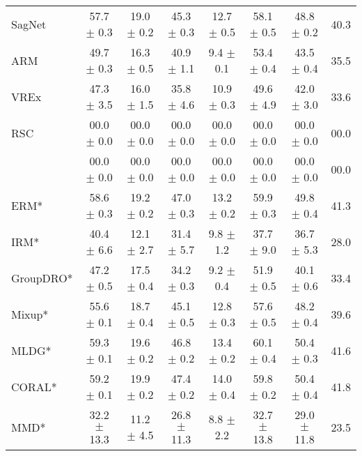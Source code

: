 \begin{table*}
\begin{center}
\begin{tabular}{lccccccc}
SagNet               & 57.7 $\pm$ 0.3       & 19.0 $\pm$ 0.2       & 45.3 $\pm$ 0.3       & 12.7 $\pm$ 0.5       & 58.1 $\pm$ 0.5       & 48.8 $\pm$ 0.2       & 40.3                 \\
ARM                  & 49.7 $\pm$ 0.3       & 16.3 $\pm$ 0.5       & 40.9 $\pm$ 1.1       & 9.4 $\pm$ 0.1        & 53.4 $\pm$ 0.4       & 43.5 $\pm$ 0.4       & 35.5                 \\
VREx                 & 47.3 $\pm$ 3.5       & 16.0 $\pm$ 1.5       & 35.8 $\pm$ 4.6       & 10.9 $\pm$ 0.3       & 49.6 $\pm$ 4.9       & 42.0 $\pm$ 3.0       & 33.6                 \\
RSC                  & 00.0 $\pm$ 0.0       & 00.0 $\pm$ 0.0        & 00.0 $\pm$ 0.0       & 00.0 $\pm$ 0.0        & 00.0 $\pm$ 0.0       & 00.0 $\pm$ 0.0      & 00.0                 \\
\divcams 	   & 00.0 $\pm$ 0.0       & 00.0 $\pm$ 0.0        & 00.0 $\pm$ 0.0       & 00.0 $\pm$ 0.0        & 00.0 $\pm$ 0.0	& 00.0 $\pm$ 0.0     & 00.0                 \\
\midrule
ERM*                  & 58.6 $\pm$ 0.3       & 19.2 $\pm$ 0.2       & 47.0 $\pm$ 0.3       & 13.2 $\pm$ 0.2       & 59.9 $\pm$ 0.3       & 49.8 $\pm$ 0.4       & 41.3                 \\
IRM*                  & 40.4 $\pm$ 6.6       & 12.1 $\pm$ 2.7       & 31.4 $\pm$ 5.7       & 9.8 $\pm$ 1.2        & 37.7 $\pm$ 9.0       & 36.7 $\pm$ 5.3       & 28.0                 \\
GroupDRO*             & 47.2 $\pm$ 0.5       & 17.5 $\pm$ 0.4       & 34.2 $\pm$ 0.3       & 9.2 $\pm$ 0.4        & 51.9 $\pm$ 0.5       & 40.1 $\pm$ 0.6       & 33.4                 \\
Mixup*                & 55.6 $\pm$ 0.1       & 18.7 $\pm$ 0.4       & 45.1 $\pm$ 0.5       & 12.8 $\pm$ 0.3       & 57.6 $\pm$ 0.5       & 48.2 $\pm$ 0.4       & 39.6                 \\
MLDG*                 & 59.3 $\pm$ 0.1       & 19.6 $\pm$ 0.2       & 46.8 $\pm$ 0.2       & 13.4 $\pm$ 0.2       & 60.1 $\pm$ 0.4       & 50.4 $\pm$ 0.3       & 41.6                 \\
CORAL*                & 59.2 $\pm$ 0.1       & 19.9 $\pm$ 0.2       & 47.4 $\pm$ 0.2       & 14.0 $\pm$ 0.4       & 59.8 $\pm$ 0.2       & 50.4 $\pm$ 0.4       & 41.8                 \\
MMD*                  & 32.2 $\pm$ 13.3      & 11.2 $\pm$ 4.5       & 26.8 $\pm$ 11.3      & 8.8 $\pm$ 2.2        & 32.7 $\pm$ 13.8      & 29.0 $\pm$ 11.8      & 23.5                 \\

\end{tabular}
\end{center}
\end{table*}
